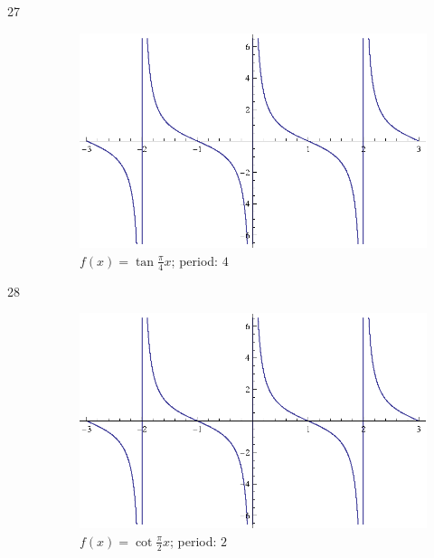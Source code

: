 \documentclass{exam}
\begin{document}
\begin{description}
      \item[27]
        \begin{figure}[H]
          \centering
          \includegraphics[scale=0.9]{exercise27.eps}
          \caption{$f(x) = \tan \frac{\pi}{4} x $; period: $4$}
        \end{figure}

      \item[28]
        \begin{figure}[H]
          \centering
          \includegraphics[scale=0.9]{exercise28.eps}
          \caption{$f(x) = \cot \frac{\pi}{2} x $; period: $2$}
        \end{figure}


\end{description}
\end{document}
